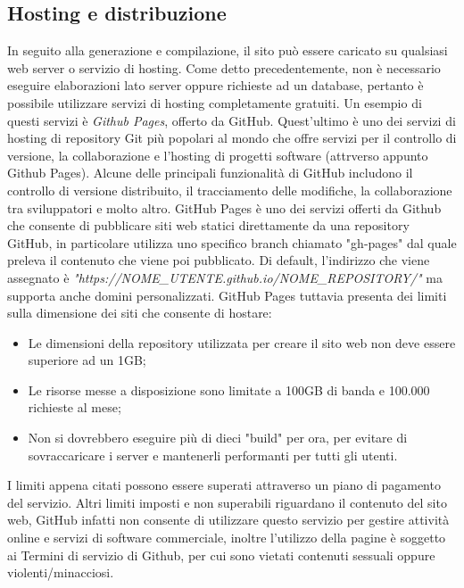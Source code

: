 \documentclass[target=bach,aauheader=]{thud}
\begin{document}
\subsection{Hosting e distribuzione}
In seguito alla generazione e compilazione, il sito può essere caricato su qualsiasi web server o servizio di hosting. Come detto precedentemente, non è necessario eseguire elaborazioni lato server oppure richieste ad un database, pertanto è possibile utilizzare servizi di hosting completamente gratuiti.
\newline
Un esempio di questi servizi è \textit{Github Pages}, offerto da GitHub. Quest'ultimo è uno dei servizi di hosting di repository Git più popolari al mondo che offre servizi per il controllo di versione, la collaborazione e l'hosting di progetti software (attrverso appunto Github Pages).
Alcune delle principali funzionalità di GitHub includono il controllo di versione distribuito, il tracciamento delle modifiche, la collaborazione tra sviluppatori e molto altro.
GitHub Pages è uno dei servizi offerti da Github che consente di pubblicare siti web statici direttamente da una repository GitHub, in particolare utilizza uno specifico branch chiamato "gh-pages" dal quale preleva il contenuto che viene poi pubblicato.
Di default, l'indirizzo che viene assegnato è \textit{"https://NOME\_UTENTE.github.io/NOME\_REPOSITORY/"} ma supporta anche domini personalizzati. 
\newline 
GitHub Pages tuttavia presenta dei limiti sulla dimensione dei siti che consente di hostare:
\begin{itemize}
    \item Le dimensioni della repository utilizzata per creare il sito web non deve essere superiore ad un 1GB;
    \item Le risorse messe a disposizione sono limitate a 100GB di banda e 100.000 richieste al mese;
    \item Non si dovrebbero eseguire più di dieci "build" per ora, per evitare di sovraccaricare i server e mantenerli performanti per tutti gli utenti.
\end{itemize}
I limiti appena citati possono essere superati attraverso un piano di pagamento del servizio.
\newline
Altri limiti imposti e non superabili riguardano il contenuto del sito web, GitHub infatti non consente di utilizzare questo servizio per gestire attività online e servizi di software commerciale, inoltre l'utilizzo della pagine è soggetto ai Termini di servizio di Github,
per cui sono vietati contenuti sessuali oppure violenti/minacciosi. 
\end{document}
